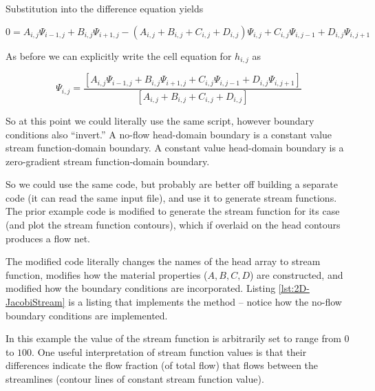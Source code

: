 Substitution into the difference equation yields

\begin{equation}
0 = A_{i,j}\Psi_{i-1,j} + B_{i,j}\Psi_{i+1,j} - (A_{i,j}+B_{i,j}+C_{i,j}+D_{i,j})\Psi_{i,j} + C_{i,j}\Psi_{i,j-1} + D_{i,j}\Psi_{i,j+1}
\end{equation}

As before we can explicitly write the cell equation for $h_{i,j}$ as

\begin{equation}
\Psi_{i,j} = \frac{[A_{i,j}\Psi_{i-1,j} + B_{i,j}\Psi_{i+1,j} + C_{i,j}\Psi_{i,j-1} + D_{i,j}\Psi_{i,j+1}]}{[A_{i,j}+B_{i,j}+C_{i,j}+D_{i,j}]}
\end{equation}

So at this point we could literally use the same script, however boundary conditions also ``invert.''
A no-flow head-domain boundary is a constant value stream function-domain boundary.
A constant value head-domain boundary is a zero-gradient stream function-domain boundary.

So we could use the same code, but probably are better off building a separate code (it can read the same input file), and use it to generate stream functions.  
The prior example code is modified to generate the stream function for its case (and plot the stream function contours), which if overlaid on the head contours produces a flow net.

The modified code literally changes the names of the head array to stream function, modifies how the material properties ($A,B,C,D$) are constructed, and modified how the boundary conditions are incorporated.  Listing \ref{lst:2D-JacobiStream} is a listing that implements the method -- notice how the no-flow boundary conditions are implemented.   

In this example the value of the stream function is arbitrarily set to range from $0$ to $100$.  One useful interpretation of stream function values is that their differences indicate the flow fraction (of total flow) that flows between the streamlines (contour lines of constant stream function value).
\clearpage

